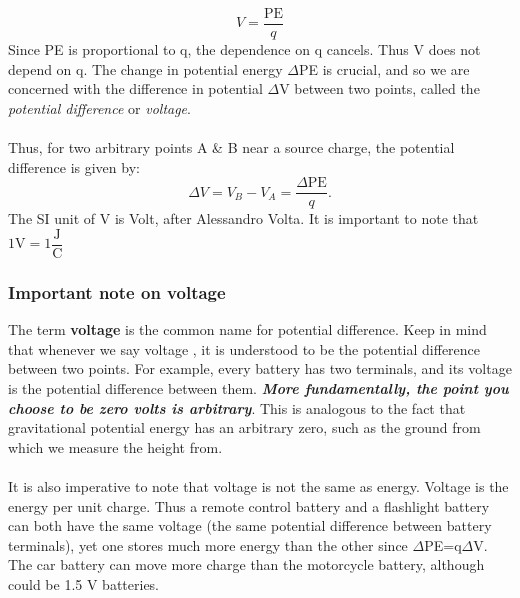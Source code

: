 \documentclass[9pt]{exam}
\begin{document}
	$$V=\dfrac{\text{PE}}{q}$$
	Since PE is proportional to  q, the dependence on  q  cancels. Thus  V  does not depend on  q. The change in potential energy  $\Delta$PE  is crucial, and so we are concerned with the difference in potential $\Delta$V  between two points, called the \textit{potential difference} or \textit{voltage}. \\ \\
	Thus, for two arbitrary points A \& B near a source charge, the potential difference is given by:
	$$\Delta V =V_{B}-V_{A}=\dfrac{\Delta \text{PE}}{q}.$$ 
	The SI unit of V is Volt, after Alessandro Volta. It is important to note that $1 \text{V}=1\dfrac{\text{J}}{\text{C}}$ \\ 
	\subsubsection*{Important note on voltage}
	The term \textbf{voltage} is the common name for potential difference. Keep in mind that whenever we say voltage , it is understood to be the potential difference between two points. For example, every battery has two terminals, and its voltage is the potential difference between them. \textit{\textbf{More fundamentally, the point you choose to be zero volts is arbitrary}}. This is analogous to the fact that gravitational potential energy has an arbitrary zero, such as the ground from which we measure the height from. \\ \\
	It is also imperative to note that voltage is not the same as energy. Voltage is the energy per unit charge. Thus a remote control battery and a flashlight battery can both have the same voltage (the same potential difference between battery terminals), yet one stores much more energy than the other since $\Delta$PE=q$\Delta$V. The car battery can move more charge than the motorcycle battery, although could be 1.5 V batteries.
\end{document}
